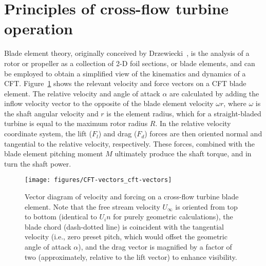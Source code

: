 \section{Principles of cross-flow turbine operation}

Blade element theory, originally conceived by
Drzewiecki~\cite{Drzewiecki1892,Drzewiecki1920}, is the analysis of a rotor or
propeller as a collection of 2-D foil sections, or blade elements, and can be
employed to obtain a simplified view of the kinematics and dynamics of a CFT.
Figure~\ref{fig:vectors} shows the relevant velocity and force vectors on a CFT
blade element. The relative velocity and angle of attack $\alpha$ are calculated
by adding the inflow velocity vector to the opposite of the blade element
velocity $\omega r$, where $\omega$ is the shaft angular velocity and $r$ is the
element radius, which for a straight-bladed turbine is equal to the maximum
rotor radius $R$. In the relative velocity coordinate system, the lift ($F_l$)
and drag ($F_d$) forces are then oriented normal and tangential to the relative
velocity, respectively. These forces, combined with the blade element pitching
moment $M$ ultimately produce the shaft torque, and in turn the shaft power.

\begin{figure}
    \centering

    \texttt{[image: figures/CFT-vectors\_cft-vectors]}

    \caption{Vector diagram of velocity and forcing on a cross-flow turbine
        blade element. Note that the free stream velocity $U_\infty$ is oriented
        from top to bottom (identical to $U_in$ for purely geometric calculations),
        the blade chord (dash-dotted line) is coincident with the tangential
        velocity (i.e., zero preset pitch, which would offset the geometric angle of
        attack $\alpha$), and the drag vector is magnified by a factor of two
        (approximately, relative to the lift vector) to enhance visibility.}

    \label{fig:vectors}
\end{figure}

